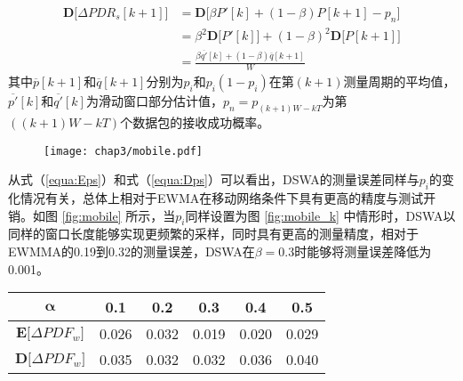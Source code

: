 \begin{equation}
\begin{split}
 \textbf{D[}\Delta PDR_s[k+1]\textbf{]}&=\textbf{D[}\beta P'[k]+(1-\beta)P[k+1]-p_{n}\textbf{]}\\
                                       &=\beta^2\textbf{D[}P'[k]\textbf{]}+(1-\beta)^2\textbf{D[}P[k+1]\textbf{]}\\
                                       &=\frac{\beta\overline{q'}[k]+(1-\beta)\overline{q}[k+1]}{W}
\end{split}
\label{equa:Dps}
\end{equation}
其中$\overline{p}[k+1]$和$\overline{q}[k+1]$分别为$p_i$和$p_i(1-p_i)$在第$(k+1)$测量周期的平均值，$\overline{p'}[k]$和$\overline{q'}[k]$为滑动窗口部分估计值，$p_n=p_{(k+1)W-kT}$为第$((k+1)W-kT)$个数据包的接收成功概率。

\begin{figure}[!htp]
\centering
\texttt{[image: chap3/mobile.pdf]}
\end{figure}

从式（\ref{equa:Eps}）和式（\ref{equa:Dps}）可以看出，DSWA的测量误差同样与$p_i$的变化情况有关，总体上相对于EWMA在移动网络条件下具有更高的精度与测试开销。如图 \ref{fig:mobile} 所示，当$p_i$同样设置为图 \ref{fig:mobile_k} 中情形时，DSWA以同样的窗口长度能够实现更频繁的采样，同时具有更高的测量精度，相对于EWMMA的0.19到0.32的测量误差，DSWA在$\beta=0.3$时能够将测量误差降低为0.001。

\begin{figure}[!htp]
\centering
{}
    \hspace{1cm}
\end{figure}

\begin{table}[!htp]
\renewcommand{\arraystretch}{1}
  \centering
\begin{threeparttable}[b]
\label{error}
\begin{tabular}{c|ccccc}
\hline
$\pmb{\alpha}$ & 0.1   & 0.2   & 0.3   & 0.4   & 0.5 \\
\hline
$\textbf{E[}\Delta PDF_w\textbf{]}$  & 0.026 & 0.032 & 0.019 & 0.020 & 0.029 \\
$\textbf{D[}\Delta PDF_w\textbf{]}$  & 0.035 & 0.032 & 0.032 & 0.036 & 0.040 \\
\hline
\end{tabular}
\end{threeparttable}
\end{table}

